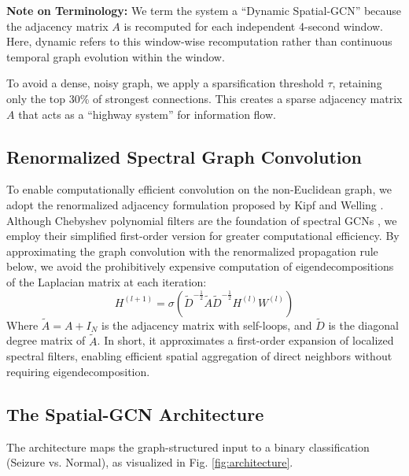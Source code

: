 \documentclass[journal]{IEEEtran}
\begin{document}
\noindent\textbf{Note on Terminology:} We term the system a ``Dynamic Spatial-GCN'' because the adjacency matrix $A$ is recomputed for each independent 4-second window. Here, dynamic refers to this window-wise recomputation rather than continuous temporal graph evolution within the window.

To avoid a dense, noisy graph, we apply a sparsification threshold $\tau$, retaining only the top 30\% of strongest connections. This creates a sparse adjacency matrix $A$ that acts as a ``highway system'' for information flow.

\subsection{Renormalized Spectral Graph Convolution}
To enable computationally efficient convolution on the non-Euclidean graph, we adopt the renormalized adjacency formulation proposed by Kipf and Welling \cite{kipf}. Although Chebyshev polynomial filters are the foundation of spectral GCNs \cite{defferrard, hammond}, we employ their simplified first-order version for greater computational efficiency. By approximating the graph convolution with the renormalized propagation rule below, we avoid the prohibitively expensive computation of eigen\-de\-com\-po\-si\-tions of the Laplacian matrix at each iteration:
\begin{equation}
H^{(l+1)} = \sigma \left( \tilde{D}^{-\frac{1}{2}} \tilde{A} \tilde{D}^{-\frac{1}{2}} H^{(l)} W^{(l)} \right)
\end{equation}
Where $\tilde{A} = A + I_N$ is the adjacency matrix with self-loops, and $\tilde{D}$ is the diagonal degree matrix of $\tilde{A}$. In short, it approximates a first-order expansion of localized spectral filters, enabling efficient spatial aggregation of direct neighbors without requiring eigen\-de\-com\-po\-si\-tion.

\subsection{The Spatial-GCN Architecture}
The architecture maps the graph-structured input to a binary classification (Seizure vs. Normal), as visualized in Fig. \ref{fig:architecture}. 
\end{document}
